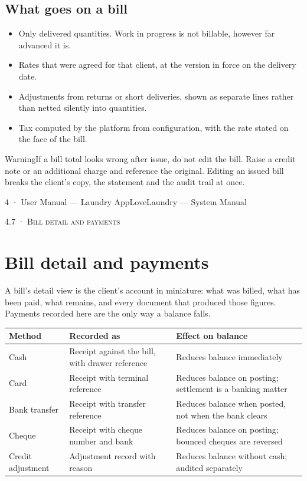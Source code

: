 \documentclass[11pt,a4paper,oneside]{book}
\begin{document}
\subsection*{What goes on a bill}
\begin{itemize}
\item Only delivered quantities. Work in progress is not billable, however far advanced it is.
\item Rates that were agreed for that client, at the version in force on the delivery date.
\item Adjustments from returns or short deliveries, shown as separate lines rather than netted silently into quantities.
\item Tax computed by the platform from configuration, with the rate stated on the face of the bill.
\end{itemize}
\begin{notebox}WarningIf a bill total looks wrong after issue, do not edit the bill. Raise a credit note or an additional charge and reference the original. Editing an issued bill breaks the client's copy, the statement and the audit trail at once.\end{notebox}
4 · User Manual — Laundry AppLoveLaundry — System Manual

\textsc{\small\color{crimson}4.7 · Bill detail and payments}\par\medskip
\section*{Bill detail and payments}
A bill's detail view is the client's account in miniature: what was billed, what has been paid, what remains, and every document that produced those figures. Payments recorded here are the only way a balance falls.

\begin{center}\small
\begin{tabularx}{\linewidth}{|X|X|X|}
\hline
\rowcolor{lightgrey}
\textbf{Method} & \textbf{Recorded as} & \textbf{Effect on balance} \\ \hline
Cash & Receipt against the bill, with drawer reference & Reduces balance immediately \\ \hline
Card & Receipt with terminal reference & Reduces balance on posting; settlement is a banking matter \\ \hline
Bank transfer & Receipt with transfer reference & Reduces balance when posted, not when the bank clears \\ \hline
Cheque & Receipt with cheque number and bank & Reduces balance on posting; bounced cheques are reversed \\ \hline
Credit adjustment & Adjustment record with reason & Reduces balance without cash; audited separately \\ \hline
\end{tabularx}
\end{center}
\end{document}
